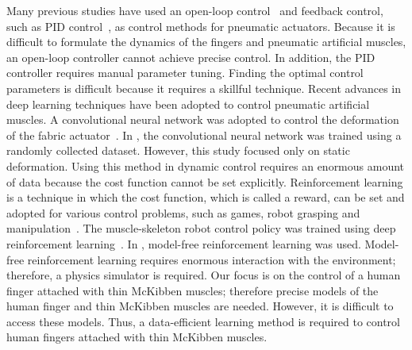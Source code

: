 \documentclass[letterpaper, 10 pt, conference]{ieeeconf}  %
\begin{document}
Many previous studies have used an open-loop control~\cite{wang2020sensor, koizumi2020soft} and feedback control, such as PID control~\cite{faudzi2016modeling, hafidz2022control, endo2020flexible}, as control methods for pneumatic actuators. Because it is difficult to formulate the dynamics of the fingers and pneumatic artificial muscles, an open-loop controller cannot achieve precise control. In addition, the PID controller requires manual parameter tuning. Finding the optimal control parameters is difficult because it requires a skillful technique. Recent advances in deep learning techniques have been adopted to control pneumatic artificial muscles. A convolutional neural network was adopted to control the deformation of the fabric actuator~\cite{yamaguchi2020three}. In \cite{yamaguchi2020three}, the convolutional neural network was trained using a randomly collected dataset. However, this study focused only on static deformation. Using this method in dynamic control requires an enormous amount of data because the cost function cannot be set explicitly. Reinforcement learning is a technique in which the cost function, which is called a reward, can be set and adopted for various control problems, such as games, robot grasping and manipulation~\cite{arulkumaran2017deep}. The muscle-skeleton robot control policy was trained using deep reinforcement learning~\cite{fan2020humanoid}. In \cite{fan2020humanoid}, model-free reinforcement learning was used. Model-free reinforcement learning requires enormous interaction with the environment; therefore, a physics simulator is required. Our focus is on the control of a human finger attached with thin McKibben muscles; therefore precise models of the human finger and thin McKibben muscles are needed. However, it is difficult to access these models. Thus, a data-efficient learning method is required to control human fingers attached with thin McKibben muscles.
\end{document}
